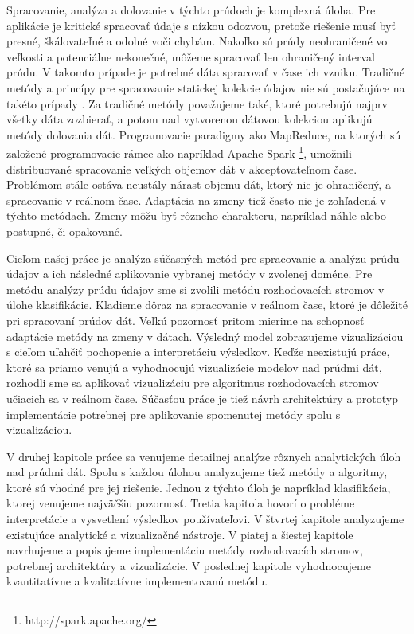 \par
Spracovanie, analýza a dolovanie v týchto prúdoch je komplexná úloha. Pre aplikácie je kritické spracovať údaje s nízkou odozvou, pretože riešenie musí byť presné, škálovateľné a odolné voči chybám. Nakoľko sú prúdy neohraničené vo veľkosti a potenciálne nekonečné, môžeme spracovať len ohraničený interval prúdu. V takomto prípade je potrebné dáta spracovať v čase ich vzniku. Tradičné metódy a princípy pre spracovanie statickej kolekcie údajov nie sú postačujúce na takéto prípady \citep{krempl2014open, han2011data}. Za tradičné metódy považujeme také, ktoré potrebujú najprv všetky dáta zozbierať, a potom nad vytvorenou dátovou kolekciou aplikujú metódy dolovania dát. Programovacie paradigmy ako MapReduce, na ktorých sú založené programovacie rámce ako napríklad Apache Spark \footnote{http://spark.apache.org/}, umožnili distribuované spracovanie veľkých objemov dát v akceptovateľnom čase. Problémom stále ostáva neustály nárast objemu dát, ktorý nie je ohraničený, a spracovanie v reálnom čase. Adaptácia na zmeny tiež často nie je zohľadená v týchto metódach. Zmeny môžu byť rôzneho charakteru, napríklad náhle alebo postupné, či opakované.
\par
Cieľom našej práce je analýza súčasných metód pre spracovanie a analýzu prúdu údajov a ich následné aplikovanie vybranej metódy v zvolenej doméne. Pre metódu analýzy prúdu údajov sme si zvolili metódu rozhodovacích stromov v úlohe klasifikácie. Kladieme dôraz na spracovanie v reálnom čase, ktoré je dôležité pri spracovaní prúdov dát. Veľkú pozornosť pritom mierime na schopnosť adaptácie metódy na zmeny v dátach. Výsledný model zobrazujeme vizualizáciou s cieľom uľahčiť pochopenie a interpretáciu výsledkov. Keďže neexistujú práce, ktoré sa priamo venujú a vyhodnocujú vizualizácie modelov nad prúdmi dát, rozhodli sme sa aplikovať vizualizáciu pre algoritmus rozhodovacích stromov učiacich sa v reálnom čase. Súčasťou práce je tiež návrh architektúry a prototyp implementácie potrebnej pre aplikovanie spomenutej metódy spolu s vizualizáciou.
\par
V druhej kapitole práce sa venujeme detailnej analýze rôznych analytických úloh nad prúdmi dát. Spolu s každou úlohou analyzujeme tiež metódy a algoritmy, ktoré sú vhodné pre jej riešenie. Jednou z týchto úloh je napríklad klasifikácia, ktorej venujeme najväčšiu pozornosť. Tretia kapitola hovorí o probléme interpretácie a vysvetlení výsledkov používateľovi. V štvrtej kapitole analyzujeme existujúce analytické a vizualizačné nástroje. V piatej a šiestej kapitole navrhujeme a popisujeme implementáciu metódy rozhodovacích stromov, potrebnej architektúry a vizualizácie. V poslednej kapitole vyhodnocujeme kvantitatívne a kvalitatívne implementovanú metódu.










